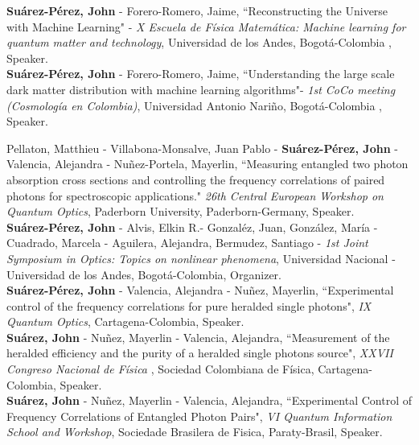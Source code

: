\documentclass[10pt, a4paper]{article}
\newcommand{\years}[1]{\marginnote{\scriptsize #1}}
\begin{document}
\years{2019}\textbf{Suárez-Pérez, John} - Forero-Romero, Jaime, “Reconstructing the Universe with Machine Learning" - \emph{X Escuela de Física Matemática: Machine learning for quantum matter and technology}, Universidad de los Andes, Bogotá-Colombia , Speaker.\\

\years{2019}\textbf{Suárez-Pérez, John} - Forero-Romero, Jaime, “Understanding the large scale dark matter distribution with machine learning
algorithms"- \emph{1st CoCo meeting (Cosmología en Colombia)}, Universidad Antonio Nariño, Bogotá-Colombia , Speaker.\\

\newpage

\years{2019}Pellaton, Matthieu - Villabona-Monsalve, Juan Pablo - \textbf{Suárez-Pérez, John} - Valencia, Alejandra - Nuñez-Portela, Mayerlin, “Measuring entangled two photon absorption cross sections and controlling the frequency correlations of paired photons for spectroscopic applications." \emph{26th Central European Workshop on Quantum Optics}, Paderborn University, Paderborn-Germany, Speaker.\\

\years{2018}\textbf{Suárez-Pérez, John} - Alvis, Elkin R.- Gonzaléz, Juan, González, María - Cuadrado, Marcela - Aguilera, Alejandra, Bermudez, Santiago - \emph{1st Joint Symposium in Optics: Topics on nonlinear phenomena}, Universidad Nacional - Universidad de los Andes, Bogotá-Colombia, Organizer.\\

\years{2018}\textbf{Suárez-Pérez, John} - Valencia, Alejandra - Nuñez, Mayerlin, “Experimental control of the frequency correlations for pure heralded single photons", \emph{IX Quantum Optics}, Cartagena-Colombia, Speaker.\\

\years{2017}\textbf{Suárez, John} - Nuñez, Mayerlin - Valencia, Alejandra, “Measurement of the heralded efficiency and the purity of a heralded single photons source", \emph{XXVII Congreso Nacional de Física} , Sociedad Colombiana de Física, Cartagena-Colombia, Speaker.\\

\years{2017}\textbf{Suárez, John} - Nuñez, Mayerlin - Valencia, Alejandra, “Experimental Control of Frequency Correlations of Entangled Photon Pairs", \emph{VI Quantum Information School and Workshop}, Sociedade Brasilera de Fisica, Paraty-Brasil, Speaker.\\
\end{document}
